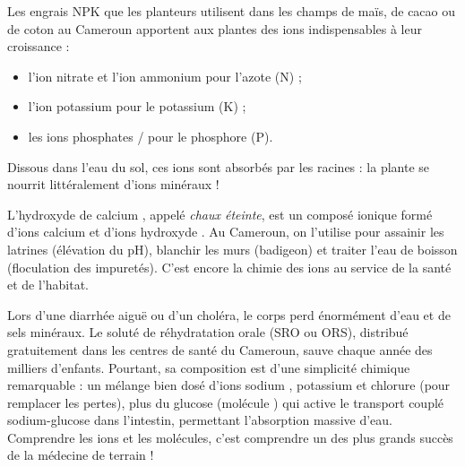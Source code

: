 \documentclass[11pt]{article}
\newcommand{\cle}[1]{{\popxbold\color{popdark}#1}}
\begin{document}
\begin{exemplebox}
Les engrais NPK que les planteurs utilisent dans les champs de maïs, de cacao ou de coton au Cameroun apportent aux plantes des ions indispensables à leur croissance :
\begin{itemize}
\item l'ion nitrate  et l'ion ammonium  pour l'azote (N) ;
\item l'ion potassium  pour le potassium (K) ;
\item les ions phosphates  /  pour le phosphore (P).
\end{itemize}
Dissous dans l'eau du sol, ces ions sont absorbés par les racines : la plante se nourrit littéralement d'ions minéraux !
\end{exemplebox}

\begin{exemplebox}
L'hydroxyde de calcium , appelé \emph{chaux éteinte}, est un composé ionique formé d'ions calcium  et d'ions hydroxyde . Au Cameroun, on l'utilise pour assainir les latrines (élévation du pH), blanchir les murs (badigeon) et traiter l'eau de boisson (floculation des impuretés). C'est encore la chimie des ions au service de la santé et de l'habitat.
\end{exemplebox}

\begin{savaistu}
Lors d'une diarrhée aiguë ou d'un choléra, le corps perd énormément d'eau et de sels minéraux. Le \cle{soluté de réhydratation orale} (SRO ou ORS), distribué gratuitement dans les centres de santé du Cameroun, sauve chaque année des milliers d'enfants. Pourtant, sa composition est d'une simplicité chimique remarquable : un mélange bien dosé d'ions sodium , potassium  et chlorure  (pour remplacer les pertes), plus du glucose (molécule ) qui active le transport couplé sodium-glucose dans l'intestin, permettant l'absorption massive d'eau. Comprendre les ions et les molécules, c'est comprendre un des plus grands succès de la médecine de terrain !
\end{savaistu}
\end{document}
